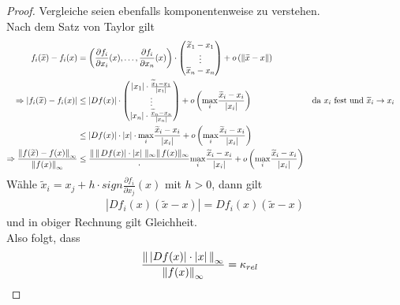 \begin{proof}
  Vergleiche seien ebenfalls komponentenweise zu verstehen. \\
  Nach dem Satz von Taylor gilt
  \begin{align*}
    f_i(\widetilde{x})-f_i(x) 
    &= \left( \frac{\partial f_i}{\partial x_i}(x), \ldots ,\frac{\partial f_i}{\partial x_n}(x) \right)
      \cdot \begin{pmatrix}
        \widetilde{x}_1-x_1 \\
        \vdots \\
        \widetilde{x}_n-x_n
      \end{pmatrix}
    + o\left(\left\| \widetilde{x}-x \right\|\right) \\
    \Rightarrow |f_i(\widetilde{x})-f_i(x)|
    &\leq |Df(x)|
      \cdot \begin{pmatrix}
        |x_1|\cdot \frac{\widetilde{x}_1-x_1 }{|x_1|}\\
        \vdots \\
        |x_n|\cdot \frac{\widetilde{x}_n-x_n }{|x_n|}
      \end{pmatrix}
    + o\left(\underset{i}{\max}\frac{\widetilde{x}_i-x_i }{|x_i|}\right) 
    && \text{da $x_i$ fest und $\widetilde{x}_i\rightarrow x_i$} \\
    &\leq |Df(x)| \cdot |x| \cdot \underset{i}{\max}\frac{\widetilde{x}_i-x_i }{|x_i|}
      +o\left(\underset{i}{\max}\frac{\widetilde{x}_i-x_i }{|x_i|}\right) \\
    \Rightarrow \frac{\left\| f(\widetilde{x})-f(x) \right\|_\infty}{\left\| f(x) \right\|_\infty}
    &\leq  \frac{\left\| \,  \right\|Df(x)|\cdot |x| \, \left\| _\infty \right\|{}f(x)\|_\infty}
      \cdot \underset{i}{\max}\frac{\widetilde{x}_i-x_i }{|x_i|}
      + o\left( \underset{i}{\max}\frac{\widetilde{x}_i-x_i }{|x_i|} \right)
  \end{align*}
  Wähle $\widetilde{x}_i = x_j+h\cdot sign \frac{\partial f_i}{\partial x_j}(x)$ mit $h>0$,
  dann gilt
  \begin{gather*}
    |Df_i(x)(\widetilde{x}-x)| = Df_i(x)(\widetilde{x}-x)
  \end{gather*}
  und in obiger Rechnung gilt Gleichheit. \\
  Also folgt, dass
  \begin{align*}
    \frac{\left\| \,|Df(x)|\cdot |x| \,  \right\|_\infty}{\left\| f(x) \right\|_\infty} &= \kappa_{rel} 
  \end{align*}
\end{proof}

